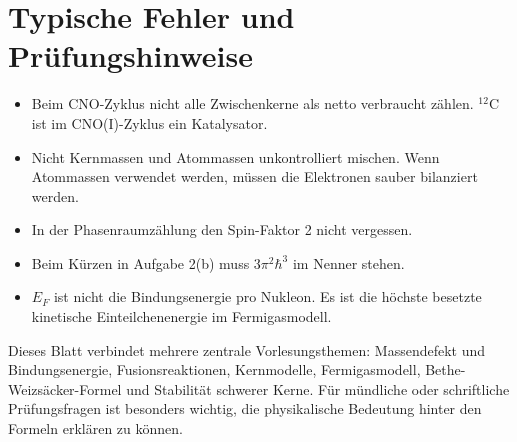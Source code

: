 \documentclass[11pt,a4paper]{scrartcl}
\newcommand{\isotope}[2]{^{#1}\mathrm{#2}}
\theoremstyle{definition}
\theoremstyle{plain}
\theoremstyle{remark}
\begin{document}
\section{Typische Fehler und Prüfungshinweise}

\begin{warningbox}[title=Typische Fehler]
\begin{itemize}
    \item Beim CNO-Zyklus nicht alle Zwischenkerne als netto verbraucht zählen. \(\isotope{12}{C}\) ist im CNO(I)-Zyklus ein Katalysator.
    \item Nicht Kernmassen und Atommassen unkontrolliert mischen. Wenn Atommassen verwendet werden, müssen die Elektronen sauber bilanziert werden.
    \item In der Phasenraumzählung den Spin-Faktor 2 nicht vergessen.
    \item Beim Kürzen in Aufgabe 2(b) muss \(3\pi^2\hbar^3\) im Nenner stehen.
    \item \(E_F\) ist nicht die Bindungsenergie pro Nukleon. Es ist die höchste besetzte kinetische Einteilchenenergie im Fermigasmodell.
\end{itemize}
\end{warningbox}

\begin{notebox}[title=Prüfungsrelevante Verknüpfungen]
Dieses Blatt verbindet mehrere zentrale Vorlesungsthemen: Massendefekt und Bindungsenergie, Fusionsreaktionen, Kernmodelle, Fermigasmodell, Bethe-Weizsäcker-Formel und Stabilität schwerer Kerne. Für mündliche oder schriftliche Prüfungsfragen ist besonders wichtig, die physikalische Bedeutung hinter den Formeln erklären zu können.
\end{notebox}
\end{document}
